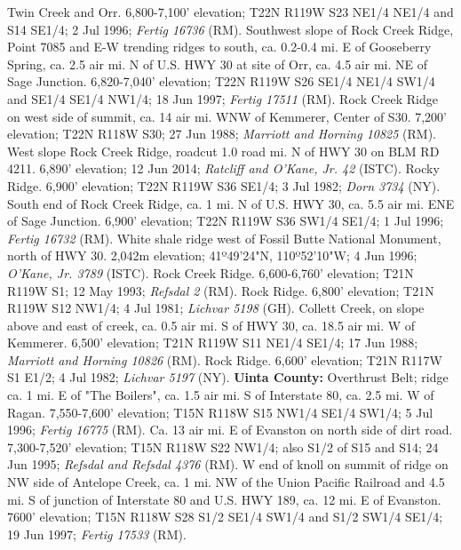 Twin Creek and Orr. 6,800-7,100' elevation; T22N R119W S23 NE1/4 NE1/4 and
S14 SE1/4; 2 Jul 1996; \textit{Fertig 16736} (RM).
Southwest slope of Rock Creek Ridge, Point 7085 and E-W trending ridges to
south, ca. 0.2-0.4 mi. E of Gooseberry Spring, ca. 2.5 air mi. N of U.S. HWY 30
at site of Orr, ca. 4.5 air mi. NE of Sage Junction. 6,820-7,040' elevation;
T22N R119W S26 SE1/4 NE1/4 SW1/4 and SE1/4 SE1/4 NW1/4; 18 Jun 1997;
\textit{Fertig 17511} (RM).
Rock Creek Ridge on west side of summit, ca. 14 air mi. WNW of Kemmerer,
Center of S30. 7,200' elevation; T22N R118W S30; 27 Jun 1988;
\textit{Marriott and Horning 10825} (RM).
West slope Rock Creek Ridge, roadcut 1.0 road mi. N of HWY 30 on BLM RD 4211.
6,890' elevation; 12 Jun 2014; \textit{Ratcliff and O'Kane, Jr. 42} (ISTC).
Rocky Ridge. 6,900' elevation; T22N R119W S36 SE1/4; 3 Jul 1982;
\textit{Dorn 3734} (NY).
South end of Rock Creek Ridge, ca. 1 mi. N of U.S. HWY 30, ca. 5.5 air mi.
ENE of Sage Junction. 6,900' elevation; T22N R119W S36 SW1/4 SE1/4;
1 Jul 1996; \textit{Fertig 16732} (RM).
White shale ridge west of Fossil Butte National Monument, north of HWY 30.
2,042m elevation; 41º49'24"N, 110º52'10"W; 4 Jun 1996;
\textit{O'Kane, Jr. 3789} (ISTC).
Rock Creek Ridge. 6,600-6,760' elevation; T21N R119W S1; 12 May 1993;
\textit{Refsdal 2} (RM).
Rock Ridge. 6,800' elevation; T21N R119W S12 NW1/4; 4 Jul 1981;
\textit{Lichvar 5198} (GH).
Collett Creek, on slope above and east of creek, ca. 0.5 air mi. S of HWY 30,
ca. 18.5 air mi. W of Kemmerer. 6,500' elevation; T21N R119W S11 NE1/4 SE1/4;
17 Jun 1988; \textit{Marriott and Horning 10826} (RM).
Rock Ridge. 6,600' elevation; T21N R117W S1 E1/2; 4 Jul 1982;
\textit{Lichvar 5197} (NY).
  \textbf{Uinta County:}
Overthrust Belt; ridge ca. 1 mi. E of "The Boilers", ca. 1.5 air mi. S of
Interstate 80, ca. 2.5 mi. W of Ragan. 7,550-7,600' elevation;
T15N R118W S15 NW1/4 SE1/4 SW1/4; 5 Jul 1996; \textit{Fertig 16775} (RM).
Ca. 13 air mi. E of Evanston on north side of dirt road. 7,300-7,520' elevation;
T15N R118W S22 NW1/4; also S1/2 of S15 and S14; 24 Jun 1995;
\textit{Refsdal and Refsdal 4376} (RM).
W end of knoll on summit of ridge on NW side of Antelope Creek, ca. 1 mi. NW of
the Union Pacific Railroad and 4.5 mi. S of junction of Interstate 80 and U.S.
HWY 189, ca. 12 mi. E of Evanston. 7600' elevation;
T15N R118W S28 S1/2 SE1/4 SW1/4 and S1/2 SW1/4 SE1/4; 19 Jun 1997;
\textit{Fertig 17533} (RM).

